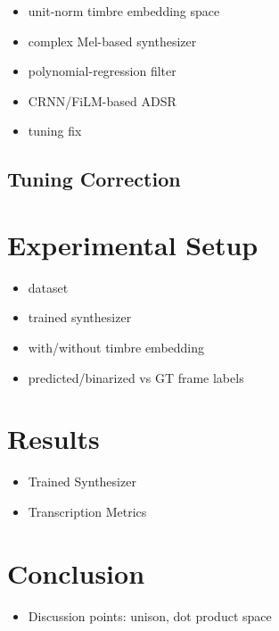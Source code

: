 \begin{itemize}
	\item unit-norm timbre embedding space
	\item complex Mel-based synthesizer
	\item polynomial-regression filter
	\item CRNN/FiLM-based ADSR
	
	\item tuning fix
\end{itemize}

\subsection{Tuning Correction}

\section{Experimental Setup}

\begin{itemize}
	\item dataset
	\item trained synthesizer
	\item with/without timbre embedding
	\item predicted/binarized vs GT frame labels
\end{itemize}

\section{Results}

\begin{itemize}
	\item Trained Synthesizer
	\item Transcription Metrics
	
\end{itemize}


\section{Conclusion}

\begin{itemize}
	\item Discussion points: unison, dot product space
\end{itemize}

